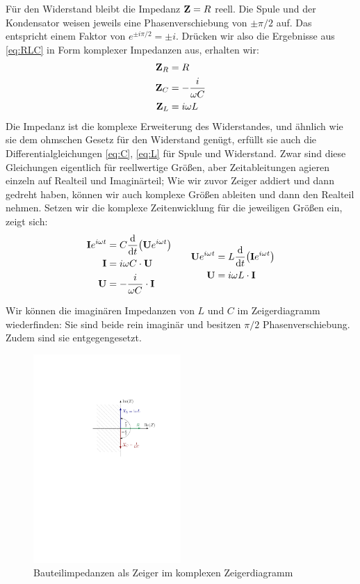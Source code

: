 Für den Widerstand bleibt die Impedanz $\mathbf{Z} = R$ reell. Die Spule und der Kondensator weisen jeweils eine
Phasenverschiebung von $\pm \pi/2$ auf. Das entspricht einem Faktor von $e^{\pm i\pi/2}= \pm i$. Drücken wir also die
Ergebnisse aus \eqref{eq:RLC} in Form komplexer Impedanzen aus, erhalten wir:
\begin{align}
    \mathbf{Z}_R &= R \\
    \mathbf{Z}_C &= -\frac i{\omega C} \\
    \mathbf{Z}_L &= i\omega L
\end{align}
Die Impedanz ist die komplexe Erweiterung des Widerstandes, und ähnlich wie sie dem ohmschen Gesetz für den Widerstand
genügt, erfüllt sie auch die Differentialgleichungen \eqref{eq:C}, \eqref{eq:L} für Spule und Widerstand. Zwar sind
diese Gleichungen eigentlich für reellwertige Größen, aber Zeitableitungen agieren einzeln auf Realteil und
Imaginärteil; Wie wir zuvor Zeiger addiert und dann gedreht haben, können wir auch komplexe Größen ableiten und dann den
Realteil nehmen. Setzen wir die komplexe Zeitenwicklung für die jeweiligen Größen ein, zeigt sich:
\begin{gather*}
    \begin{aligned}
        \mathbf{I}e^{i\omega t} &= C\dv{t}(\mathbf{U}e^{i\omega t}) \\
        \mathbf{I} &= i\omega C \cdot \mathbf{U} \\
        \mathbf{U} &= - \frac{i}{\omega C} \cdot \mathbf{I}
    \end{aligned}
    \qquad
    \begin{aligned}
        \mathbf{U}e^{i\omega t} &= L\dv{t}(\mathbf{I}e^{i\omega t}) \\
        \mathbf{U} &= i\omega L \cdot \mathbf{I}
    \end{aligned}
\end{gather*}

Wir können die imaginären Impedanzen von $L$ und $C$ im Zeigerdiagramm wiederfinden: Sie sind beide
rein imaginär und besitzen $\pi/2$ Phasenverschiebung. Zudem sind sie entgegengesetzt.
\begin{figure}[H]
    \centering
    \includegraphics[width=0.5\textwidth]{kCompZeiger.pdf}
    \caption{Bauteilimpedanzen als Zeiger im komplexen Zeigerdiagramm}
\end{figure}
